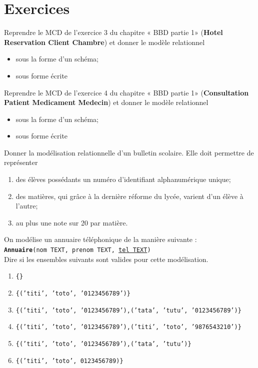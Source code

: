 \documentclass[10pt,cours,a4paper,firamath]{nsi}
\begin{document}
\section{Exercices}

\begin{exercice}[]
	Reprendre le MCD de l'exercice 3 du chapitre « BBD partie 1» (\textbf{Hotel Reservation Client Chambre}) et donner le modèle relationnel
	\begin{itemize}
		\item	sous la forme d'un schéma;
		\item	sous forme écrite
	\end{itemize}
\end{exercice}

\begin{exercice}[]
	Reprendre le MCD de l'exercice 4 du chapitre « BBD partie 1» (\textbf{Consultation Patient Medicament Medecin}) et donner le modèle relationnel
	\begin{itemize}
		\item	sous la forme d'un schéma;
		\item	sous forme écrite
	\end{itemize}
\end{exercice}

\begin{exercice}[]
	Donner la modélisation relationnelle d'un bulletin scolaire. Elle doit permettre de représenter
	\begin{enumerate}
		\item 	des élèves possédants un numéro d'identifiant alphanumérique unique;
		\item 	des matières, qui grâce à la dernière réforme du lycée, varient d'un élève à l'autre;
		\item 	au plus une note sur 20 par matière.
	\end{enumerate}
\end{exercice}

\begin{exercice}[]
	On modélise un annuaire téléphonique de la manière suivante :\\
	
	\texttt{\textbf{Annuaire}(nom TEXT, prenom TEXT, \uline{tel TEXT})}\\
	
	Dire si les ensembles suivants sont valides pour cette modélisation.
	\begin{enumerate}
		\item 	\texttt{\{\}}
		\item 	\texttt{\{('titi', 'toto', '0123456789')\}}
		\item 	\texttt{\{('titi', 'toto', '0123456789'),('tata', 'tutu', '0123456789')\}}
		\item 	\texttt{\{('titi', 'toto', '0123456789'),('titi', 'toto', '9876543210')\}}
		\item 	\texttt{\{('titi', 'toto', '0123456789'),('tata', 'tutu')\}}
		\item 	\texttt{\{('titi', 'toto', 0123456789)\}}
	\end{enumerate}
\end{exercice}
\end{document}
